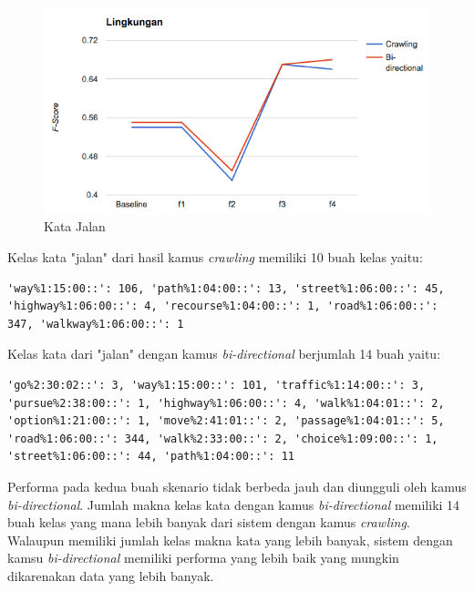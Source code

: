 \begin{figure}
	\centering
	\includegraphics[width=1\linewidth]{adit_pics/lingkungan.png}
	\caption{Kata Jalan}
	\label{fig:jalan}
\end{figure}

Kelas kata "jalan" dari hasil kamus \textit{crawling} memiliki 10 buah kelas yaitu:
\begin{lstlisting}
'way%1:15:00::': 106, 'path%1:04:00::': 13, 'street%1:06:00::': 45, 'highway%1:06:00::': 4, 'recourse%1:04:00::': 1, 'road%1:06:00::': 347, 'walkway%1:06:00::': 1
\end{lstlisting}
Kelas kata dari "jalan" dengan kamus \textit{bi-directional} berjumlah 14 buah yaitu:
\begin{lstlisting}
'go%2:30:02::': 3, 'way%1:15:00::': 101, 'traffic%1:14:00::': 3, 'pursue%2:38:00::': 1, 'highway%1:06:00::': 4, 'walk%1:04:01::': 2, 'option%1:21:00::': 1, 'move%2:41:01::': 2, 'passage%1:04:01::': 5, 'road%1:06:00::': 344, 'walk%2:33:00::': 2, 'choice%1:09:00::': 1, 'street%1:06:00::': 44, 'path%1:04:00::': 11
\end{lstlisting}

Performa pada kedua buah skenario tidak berbeda jauh dan diungguli oleh kamus \textit{bi-directional}. Jumlah makna kelas kata dengan kamus \textit{bi-directional} memiliki 14 buah kelas yang mana lebih banyak dari sistem dengan kamus \textit{crawling}. Walaupun memiliki jumlah kelas makna kata yang lebih banyak, sistem dengan kamsu \textit{bi-directional} memiliki performa yang lebih baik yang mungkin dikarenakan data yang lebih banyak.

